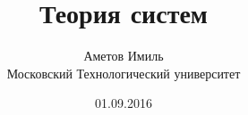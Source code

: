 \documentclass[a4paper, 12pt]{book}
\title{Теория систем}
\date{01.09.2016}
\author{Аметов Имиль \\ Московский Технологический университет}
\begin{document}
\renewcommand {\contentsname} {Оглавление}
\renewcommand {\chaptername} {Глава}
{\let\newpage\relax\maketitle}
\maketitle
\newpage
\tableofcontents

%
%
%
%
\end{document}
